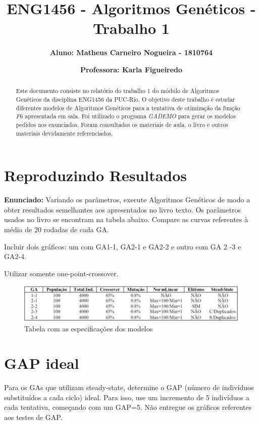 \documentclass[12pt]{article}
\title{\textbf{ENG1456 - Algoritmos Genéticos - Trabalho 1}}
\author{\textbf{Aluno: Matheus Carneiro Nogueira - 1810764}}
\affil{}
\author{\textbf{Professora: Karla Figueiredo}}
\affil{}
\date{}
\begin{document}
	\maketitle
	\tableofcontents
	
	
	\begin{abstract}
		Este documento consiste no relatório do trabalho 1 do módulo de Algoritmos Genéticos da disciplina ENG1456 da PUC-Rio. O objetivo deste trabalho é estudar diferentes modelos de Algoritmos Genéticos para a tentativa de otimização da função $F6$ apresentada em sala. Foi utilizado o programa \textit{GADEMO} para gerar os modelos pedidos nos enunciados. Foram consultados os materiais de aula, o livro \cite{davis1991handbook} e outros materiais devidamente referenciados.
	\end{abstract}
	
\section{Reproduzindo Resultados}

\textbf{Enunciado:}
Variando os parâmetros, execute Algoritmos Genéticos de modo a obter resultados semelhantes aos apresentados no livro texto. Os parâmetros usados no livro se encontram na tabela abaixo. Compare as curvas referentes à média de 20 rodadas de cada GA.

Incluir dois gráficos: um com GA1-1, GA2-1 e GA2-2 e outro com GA 2 -3 e GA2-4.

Utilizar somente one-point-crossover.

\begin{figure}[H]
	\centering
	\includegraphics[width=0.9\linewidth]{Imagens/tabela_especificacao_modelos}
	\caption{Tabela com as especificações dos modelos}
	\label{fig:tabelaespecificacaomodelos}
\end{figure}

\section{GAP ideal}
Para os GAs que utilizam steady-state, determine o GAP (número de indivíduos substituídos a cada ciclo) ideal. Para isso, use um incremento de 5 indivíduos a cada tentativa, começando com um GAP=5. Não entregue os gráficos referentes aos testes de GAP.
\end{document}
